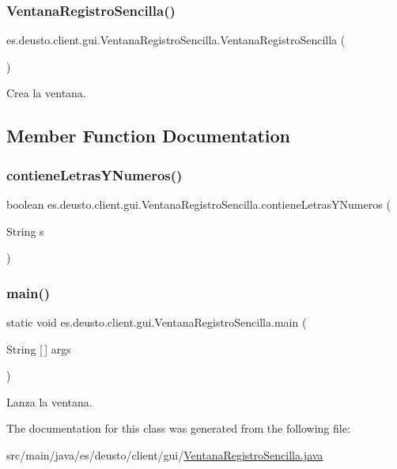 \subsubsection{\texorpdfstring{VentanaRegistroSencilla()}{VentanaRegistroSencilla()}}
{\footnotesize\ttfamily es.\+deusto.\+client.\+gui.\+Ventana\+Registro\+Sencilla.\+Ventana\+Registro\+Sencilla (\begin{DoxyParamCaption}{ }\end{DoxyParamCaption})}

Crea la ventana. 

\subsection{Member Function Documentation}
\mbox{\label{classes_1_1deusto_1_1client_1_1gui_1_1_ventana_registro_sencilla_ade8fc5021e7ef78b34131550b483b095}} 
\subsubsection{\texorpdfstring{contieneLetrasYNumeros()}{contieneLetrasYNumeros()}}
{\footnotesize\ttfamily boolean es.\+deusto.\+client.\+gui.\+Ventana\+Registro\+Sencilla.\+contiene\+Letras\+Y\+Numeros (\begin{DoxyParamCaption}\item[{String}]{s }\end{DoxyParamCaption})}

\mbox{\label{classes_1_1deusto_1_1client_1_1gui_1_1_ventana_registro_sencilla_afbed3926824c094b8d30800f8708782b}} 
\subsubsection{\texorpdfstring{main()}{main()}}
{\footnotesize\ttfamily static void es.\+deusto.\+client.\+gui.\+Ventana\+Registro\+Sencilla.\+main (\begin{DoxyParamCaption}\item[{String \mbox{[}$\,$\mbox{]}}]{args }\end{DoxyParamCaption})\hspace{0.3cm}{\ttfamily [static]}}

Lanza la ventana. 

The documentation for this class was generated from the following file\+:\begin{DoxyCompactItemize}
\item 
src/main/java/es/deusto/client/gui/\mbox{\hyperlink{_ventana_registro_sencilla_8java}{Ventana\+Registro\+Sencilla.\+java}}\end{DoxyCompactItemize}
